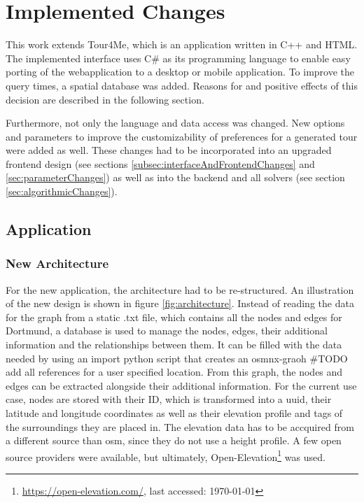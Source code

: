 \chapter{Implemented Changes}
\label{chapter:implementedChanges}

This work extends Tour4Me, which is an application written in C++ and HTML. 
The implemented interface uses C\# as its programming language to enable easy porting of the webapplication to a desktop or mobile application.
To improve the query times, a spatial database was added. 
Reasons for and positive effects of this decision are described in the following section.

Furthermore, not only the language and data access was changed.
New options and parameters to improve the customizability of preferences for a generated tour were added as well.
These changes had to be incorporated into an upgraded frontend design (see sections \ref{subsec:interfaceAndFrontendChanges} and \ref{sec:parameterChanges}) as well as into the backend and all solvers (see section \ref{sec:algorithmicChanges}). 


\section{Application}
\label{sec:application}

\subsection{New Architecture}
\label{sec:newArchitecture}

For the new application, the architecture had to be re-structured.
An illustration of the new design is shown in figure \ref{fig:architecture}.
Instead of reading the data for the graph from a static .txt file, which contains all the nodes and edges for Dortmund, a database is used to manage the nodes, edges, their additional information and the relationships between them. 
It can be filled with the data needed by using an import python script that creates an osmnx-graoh \#TODO add all references for a user specified location. 
From this graph, the nodes and edges can be extracted alongside their additional information.
For the current use case, nodes are stored with their ID, which is transformed into a uuid, their latitude and longitude coordinates as well as their elevation profile and tags of the surroundings they are placed in.
The elevation data has to be accquired from a different source than osm, since they do not use a height profile. 
A few open source providers were available, but ultimately, Open-Elevation\footnote{\url{https://open-elevation.com/}, last accessed: \today} was used. 

